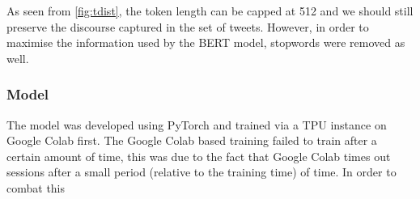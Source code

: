 As seen from \cref{fig:tdist}, the token length can be capped at 512 and we should still preserve the discourse captured in the set of tweets.
However, in order to maximise the information used by the BERT model, stopwords were removed as well. 

\subsubsection{Model}
The model was developed using PyTorch \cite{pytorch} and trained via a TPU instance on Google Colab first. 
The Google Colab based training failed to train after a certain amount of time, this was due to the fact that Google Colab times out 
sessions after a small period (relative to the training time) of time. In order to combat this
